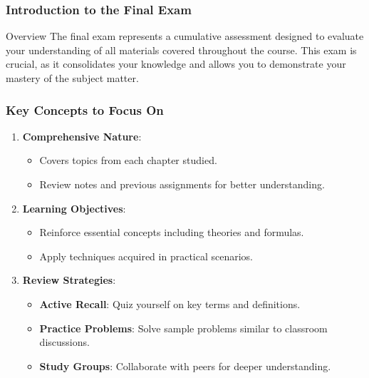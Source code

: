 \documentclass[aspectratio=169]{beamer}
\begin{document}
\frame{\titlepage}

\begin{frame}[fragile]
    \frametitle{Introduction to the Final Exam}
    
    \begin{block}{Overview}
        The final exam represents a cumulative assessment designed to evaluate your understanding of all materials covered throughout the course. This exam is crucial, as it consolidates your knowledge and allows you to demonstrate your mastery of the subject matter.
    \end{block}
\end{frame}

\begin{frame}[fragile]
    \frametitle{Key Concepts to Focus On}

    \begin{enumerate}
        \item \textbf{Comprehensive Nature}:
        \begin{itemize}
            \item Covers topics from each chapter studied.
            \item Review notes and previous assignments for better understanding.
        \end{itemize}

        \item \textbf{Learning Objectives}:
        \begin{itemize}
            \item Reinforce essential concepts including theories and formulas.
            \item Apply techniques acquired in practical scenarios.
        \end{itemize}

        \item \textbf{Review Strategies}:
        \begin{itemize}
            \item \textbf{Active Recall}: Quiz yourself on key terms and definitions.
            \item \textbf{Practice Problems}: Solve sample problems similar to classroom discussions.
            \item \textbf{Study Groups}: Collaborate with peers for deeper understanding.
        \end{itemize}
    \end{enumerate}
\end{frame}
\end{document}
